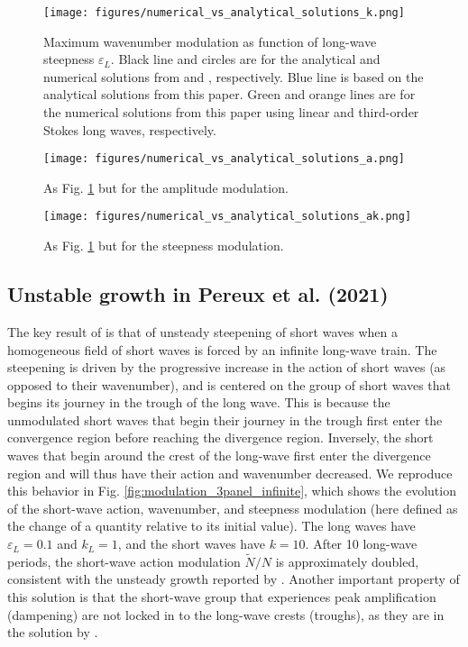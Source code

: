 \documentclass[lineno]{jfm}
\begin{document}
\begin{figure}
\centering
\texttt{[image: figures/numerical\_vs\_analytical\_solutions\_k.png]}
\caption{
  Maximum wavenumber modulation as function of long-wave steepness $\varepsilon_L$.
  Black line and circles are for the analytical and numerical solutions from
  \citet{longuet1960changes} and \citet{longuet1987propagation}, respectively.
  Blue line is based on the analytical solutions from this paper.
  Green and orange lines are for the numerical solutions from this paper
  using linear and third-order Stokes long waves, respectively.
}
\label{fig:numerical_vs_analytical_k}
\end{figure}

\begin{figure}
\centering
\texttt{[image: figures/numerical\_vs\_analytical\_solutions\_a.png]}
\caption{
  As Fig. \ref{fig:numerical_vs_analytical_k} but for the amplitude modulation.
}
\label{fig:numerical_vs_analytical_a}
\end{figure}

\begin{figure}
\centering
\texttt{[image: figures/numerical\_vs\_analytical\_solutions\_ak.png]}
\caption{
  As Fig. \ref{fig:numerical_vs_analytical_k} but for the steepness modulation.
}
\label{fig:numerical_vs_analytical_ak}
\end{figure}

\subsection{Unstable growth in Pereux et al. (2021)}
\label{subsection:unstable_growth}

The key result of \citet{peureux2021unsteady} is that of unsteady steepening of
short waves when a homogeneous field of short waves is forced by an infinite
long-wave train.
The steepening is driven by the progressive increase in the action of short
waves (as opposed to their wavenumber), and is centered on the group of short
waves that begins its journey in the trough of the long wave.
This is because the unmodulated short waves that begin their journey in the
trough first enter the convergence region before reaching the divergence region.
Inversely, the short waves that begin around the crest of the long-wave first
enter the divergence region and will thus have their action and wavenumber
decreased.
We reproduce this behavior in Fig. \ref{fig:modulation_3panel_infinite}, which
shows the evolution of the short-wave action, wavenumber, and steepness
modulation (here defined as the change of a quantity relative to its initial value).
The long waves have $\varepsilon_L = 0.1$ and $k_L = 1$, and the short waves
have $k = 10$.
After 10 long-wave periods, the short-wave action modulation $\widetilde{N}/N$
is approximately doubled, consistent with the unsteady growth reported by
\citet{peureux2021unsteady}.
Another important property of this solution is that the short-wave group that
experiences peak amplification (dampening) are not locked in to the long-wave
crests (troughs), as they are in the solution by \citet{longuet1960changes}.
\end{document}
